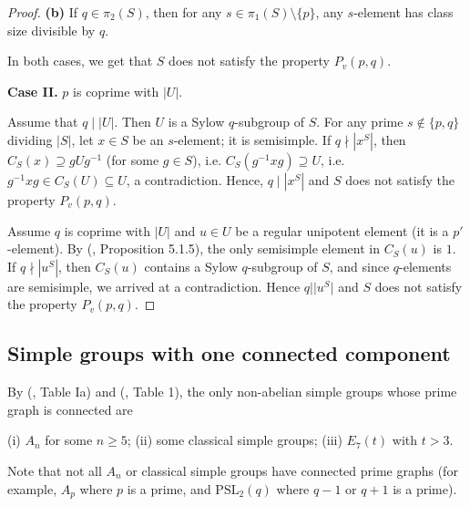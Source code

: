 \documentclass[11pt, a4paper]{article}
\numberwithin{equation}{section}
\theoremstyle{plain} %
\begin{document}
\begin{proof}
{\bf (b)} If $q\in \pi_2(S)$, then for any $s\in\pi_1(S)\setminus\{p\}$, any $s$-element has class size divisible by $q$.  

In both cases, we get that $S$ does not satisfy the property $P_v(p,q)$.


\vskip3mm
\textbf{Case II.} $p$ is coprime with $|U|$.

Assume that $q\mid |U|$. Then $U$ is a Sylow $q$-subgroup of $S$. For any prime $s\notin \{p,q\}$ dividing $|S|$,  let $x\in S$ be an $s$-element; it is semisimple. If $q\nmid |x^S|$, then $C_S(x)\supseteq gUg^{-1}$ (for some $g\in S$), i.e. $C_S(g^{-1}xg)\supseteq U$, i.e. $g^{-1}xg \in C_S(U)\subseteq U$, a contradiction. Hence, $q\mid |x^S|$ and $S$ does not satisfy the property $P_v(p,q)$. 

Assume $q$ is coprime with $|U|$ and $u\in U$ be a regular unipotent element (it is a $p'$-element). By (\cite{MR794307}, Proposition 5.1.5), the only semisimple element in $C_S(u)$ is $1$. If $q\nmid |u^S|$, then $C_S(u)$ contains a Sylow $q$-subgroup of $S$, and since $q$-elements are semisimple, we arrived at a contradiction. Hence $q||u^S|$ and $S$ does not satisfy the property $P_v(p,q)$.  
\end{proof}


 
\subsection*{Simple groups with one connected component}
By (\cite{MR617092}, Table Ia) and (\cite{MR1015040}, Table 1), the only non-abelian simple groups whose prime graph is connected are 

(i) $A_n$ for some $n\geq 5$; (ii) some classical simple groups; (iii) $E_7(t)$ with $t>3$. 

\vskip3mm 
Note that not all $A_n$ or classical simple groups have connected prime graphs (for example, $A_p$ where $p$ is a prime, and $\mathrm{PSL}_2(q)$ where $q-1$ or $q+1$ is a prime). 
 
\end{document}
